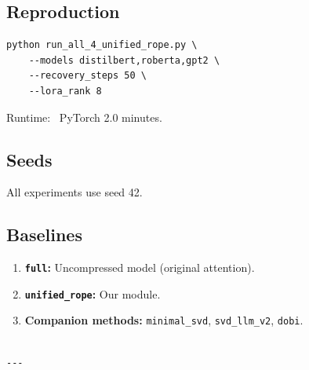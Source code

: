 \subsection{Reproduction}

\begin{lstlisting}
python run_all_4_unified_rope.py \
    --models distilbert,roberta,gpt2 \
    --recovery_steps 50 \
    --lora_rank 8
\end{lstlisting}

Runtime: ~PyTorch 2.0 minutes.

\subsection{Seeds}

All experiments use seed 42.

\subsection{Baselines}

\begin{enumerate}
\item \textbf{\texttt{full}:} Uncompressed model (original attention).
\item \textbf{\texttt{unified\_rope}:} Our module.
\item \textbf{Companion methods:} \texttt{minimal\_svd}, \texttt{svd\_llm\_v2}, \texttt{dobi}.
\end{enumerate}
\begin{lstlisting}

---
\end{lstlisting}